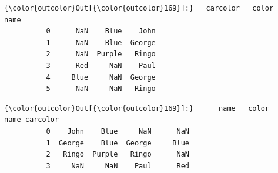 \documentclass[11pt]{article}
\begin{document}
\begin{Verbatim}[commandchars=\\\{\}]
{\color{outcolor}Out[{\color{outcolor}169}]:}   carcolor   color    name
          0      NaN    Blue    John
          1      NaN    Blue  George
          2      NaN  Purple   Ringo
          3      Red     NaN    Paul
          4     Blue     NaN  George
          5      NaN     NaN   Ringo
\end{Verbatim}
            
\begin{Verbatim}[commandchars=\\\{\}]
{\color{outcolor}Out[{\color{outcolor}169}]:}      name   color    name carcolor
          0    John    Blue     NaN      NaN
          1  George    Blue  George     Blue
          2   Ringo  Purple   Ringo      NaN
          3     NaN     NaN    Paul      Red
\end{Verbatim}
            
\end{document}
